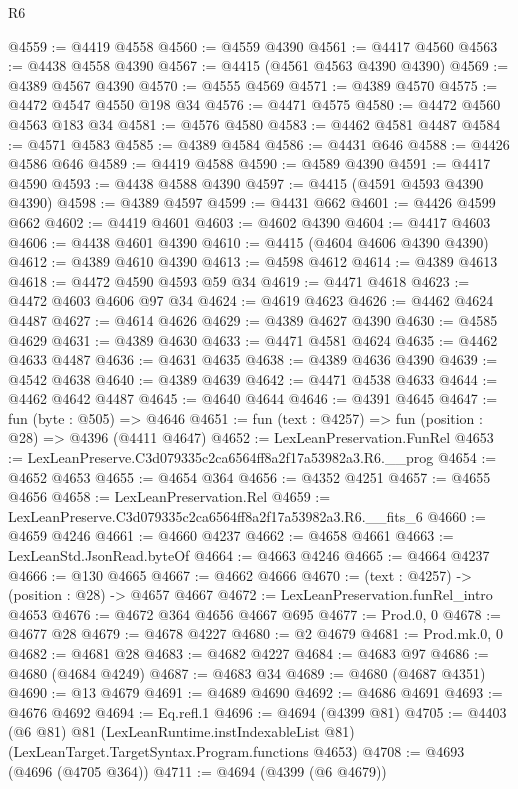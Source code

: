 \begin{lexlean}{R6}
\begin{coremodule}
@4559 := @4419 @4558
@4560 := @4559 @4390
@4561 := @4417 @4560
@4563 := @4438 @4558 @4390
@4567 := @4415 (@4561 @4563 @4390 @4390)
@4569 := @4389 @4567 @4390
@4570 := @4555 @4569
@4571 := @4389 @4570
@4575 := @4472 @4547 @4550 @198 @34
@4576 := @4471 @4575
@4580 := @4472 @4560 @4563 @183 @34
@4581 := @4576 @4580
@4583 := @4462 @4581 @4487
@4584 := @4571 @4583
@4585 := @4389 @4584
@4586 := @4431 @646
@4588 := @4426 @4586 @646
@4589 := @4419 @4588
@4590 := @4589 @4390
@4591 := @4417 @4590
@4593 := @4438 @4588 @4390
@4597 := @4415 (@4591 @4593 @4390 @4390)
@4598 := @4389 @4597
@4599 := @4431 @662
@4601 := @4426 @4599 @662
@4602 := @4419 @4601
@4603 := @4602 @4390
@4604 := @4417 @4603
@4606 := @4438 @4601 @4390
@4610 := @4415 (@4604 @4606 @4390 @4390)
@4612 := @4389 @4610 @4390
@4613 := @4598 @4612
@4614 := @4389 @4613
@4618 := @4472 @4590 @4593 @59 @34
@4619 := @4471 @4618
@4623 := @4472 @4603 @4606 @97 @34
@4624 := @4619 @4623
@4626 := @4462 @4624 @4487
@4627 := @4614 @4626
@4629 := @4389 @4627 @4390
@4630 := @4585 @4629
@4631 := @4389 @4630
@4633 := @4471 @4581 @4624
@4635 := @4462 @4633 @4487
@4636 := @4631 @4635
@4638 := @4389 @4636 @4390
@4639 := @4542 @4638
@4640 := @4389 @4639
@4642 := @4471 @4538 @4633
@4644 := @4462 @4642 @4487
@4645 := @4640 @4644
@4646 := @4391 @4645
@4647 := fun (byte : @505) => @4646
@4651 := fun (text : @4257) => fun (position : @28) => @4396 (@4411 @4647)
@4652 := LexLeanPreservation.FunRel
@4653 := LexLeanPreserve.C3d079335c2ca6564ff8a2f17a53982a3.R6.__prog
@4654 := @4652 @4653
@4655 := @4654 @364
@4656 := @4352 @4251
@4657 := @4655 @4656
@4658 := LexLeanPreservation.Rel
@4659 := LexLeanPreserve.C3d079335c2ca6564ff8a2f17a53982a3.R6.__fits_6
@4660 := @4659 @4246
@4661 := @4660 @4237
@4662 := @4658 @4661
@4663 := LexLeanStd.JsonRead.byteOf
@4664 := @4663 @4246
@4665 := @4664 @4237
@4666 := @130 @4665
@4667 := @4662 @4666
@4670 := (text : @4257) -> (position : @28) -> @4657 @4667
@4672 := LexLeanPreservation.funRel_intro @4653
@4676 := @4672 @364 @4656 @4667 @695
@4677 := Prod.{0, 0}
@4678 := @4677 @28
@4679 := @4678 @4227
@4680 := @2 @4679
@4681 := Prod.mk.{0, 0}
@4682 := @4681 @28
@4683 := @4682 @4227
@4684 := @4683 @97
@4686 := @4680 (@4684 @4249)
@4687 := @4683 @34
@4689 := @4680 (@4687 @4351)
@4690 := @13 @4679
@4691 := @4689 @4690
@4692 := @4686 @4691
@4693 := @4676 @4692
@4694 := Eq.refl.{1}
@4696 := @4694 (@4399 @81)
@4705 := @4403
    (@6 @81)
    @81
    (LexLeanRuntime.instIndexableList @81)
    (LexLeanTarget.TargetSyntax.Program.functions @4653)
@4708 := @4693 (@4696 (@4705 @364))
@4711 := @4694 (@4399 (@6 @4679))

\end{coremodule}
\end{lexlean}

